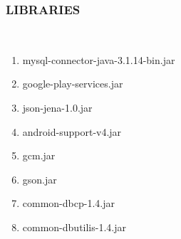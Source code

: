 \documentclass[12pt,a4paper]{article}
\begin{document}
\subsubsection{LIBRARIES}
\\
\begin{enumerate}
\item mysql-connector-java-3.1.14-bin.jar
\\
\item google-play-services.jar
\\
\item json-jena-1.0.jar
\\
\item android-support-v4.jar
\\
\item gcm.jar
\\
\item gson.jar
\\
\item common-dbcp-1.4.jar
\\
\item common-dbutilis-1.4.jar
\\
\end{enumerate}
\\
\end{document}

